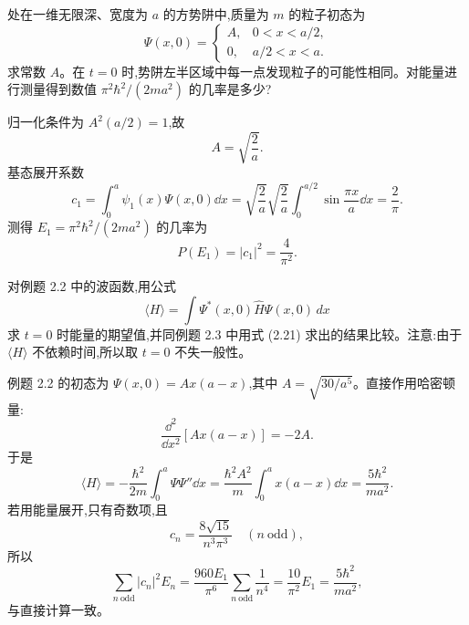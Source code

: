 \begin{question}
处在一维无限深、宽度为 $a$ 的方势阱中,质量为 $m$ 的粒子初态为
\[
\Psi(x,0)=
\begin{cases}
A, & 0<x<a/2,\\
0, & a/2<x<a.
\end{cases}
\]
求常数 $A$。在 $t=0$ 时,势阱左半区域中每一点发现粒子的可能性相同。对能量进行测量得到数值 $\pi^2\hbar^2/(2ma^2)$ 的几率是多少?
\begin{solution}
归一化条件为 $A^2(a/2)=1$,故
\[
A=\sqrt{\frac2a}.
\]
基态展开系数
\[
 c_1=\int_0^a\psi_1(x)\Psi(x,0)\dd x
 =\sqrt{\frac2a}\sqrt{\frac2a}\int_0^{a/2}\sin\frac{\pi x}{a}\dd x
 =\frac2\pi.
\]
测得 $E_1=\pi^2\hbar^2/(2ma^2)$ 的几率为
\[
P(E_1)=|c_1|^2=\frac4{\pi^2}.
\]
\end{solution}
\end{question}

\begin{question}
对例题 2.2 中的波函数,用公式
\[
\langle H\rangle=\int \Psi^*(x,0)\hat H\Psi(x,0)\,dx
\]
求 $t=0$ 时能量的期望值,并同例题 2.3 中用式 (2.21) 求出的结果比较。注意:由于 $\langle H\rangle$ 不依赖时间,所以取 $t=0$ 不失一般性。

\par\smallskip
{}

\begin{solution}
例题 2.2 的初态为 $\Psi(x,0)=A x(a-x)$,其中 $A=\sqrt{30/a^5}$。直接作用哈密顿量:
\[
\frac{\dd^2}{\dd x^2}[Ax(a-x)]=-2A.
\]
于是
\[
\langle H\rangle
=-\frac{\hbar^2}{2m}\int_0^a\Psi\Psi''\dd x
=\frac{\hbar^2A^2}{m}\int_0^a x(a-x)\dd x
=\frac{5\hbar^2}{ma^2}.
\]
若用能量展开,只有奇数项,且
\[
 c_n=\frac{8\sqrt{15}}{n^3\pi^3}\quad(n\ \mathrm{odd}),
\]
所以
\[
\sum_{n\ \mathrm{odd}} |c_n|^2E_n
=\frac{960E_1}{\pi^6}\sum_{n\ \mathrm{odd}}\frac1{n^4}
=\frac{10}{\pi^2}E_1
=\frac{5\hbar^2}{ma^2},
\]
与直接计算一致。
\end{solution}
\end{question}

